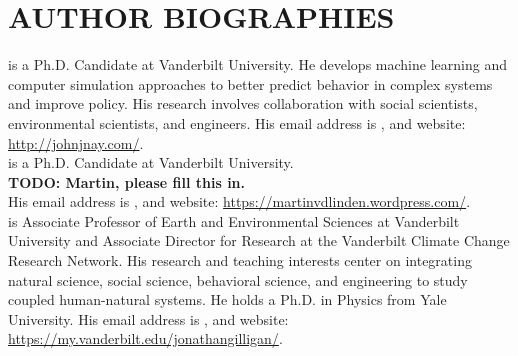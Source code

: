 \documentclass{wscpaperproc}\usepackage[]{graphicx}\usepackage[]{color}
\begin{document}
\section*{AUTHOR BIOGRAPHIES}

 is a Ph.D. Candidate at Vanderbilt University. He develops machine learning and computer simulation approaches to better predict behavior in complex systems and improve policy. His research involves collaboration with social scientists, environmental scientists, and engineers. His email address is , and website: \href{http://johnjnay.com/}{http://johnjnay.com/}.\\

 is a Ph.D. Candidate at Vanderbilt University. \\
\textbf{TODO: Martin, please fill this in.}\\
His email address is , and website: \href{https://martinvdlinden.wordpress.com/}{https://martinvdlinden.wordpress.com/}.\\

 is Associate Professor of Earth and Environmental Sciences at Vanderbilt University and Associate Director for Research at the Vanderbilt Climate Change Research Network. His research and teaching interests center on integrating natural science, social science, behavioral science, and engineering to study coupled human-natural systems. He holds a  Ph.D. in Physics from Yale University. His email address is , and website: \href{https://my.vanderbilt.edu/jonathangilligan/}{https://my.vanderbilt.edu/jonathangilligan/}.
\end{document}
